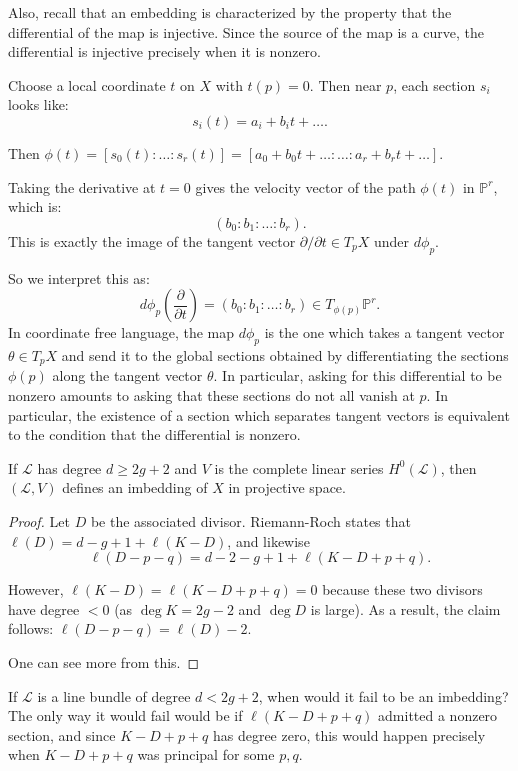 \documentclass[12pt]{article}
\begin{document}
Also, recall that an embedding is characterized by the property that the differential of the map is injective. Since the source of the map is a curve, the differential is injective precisely when it is nonzero. 

Choose a local coordinate $t$ on $X$ with $t(p) = 0$. Then near $p$, each section $s_i$ looks like:
\[
s_i(t) = a_i + b_i t + \ldots.
\]

Then $\phi(t) = [s_0(t) : \ldots : s_r(t)] = [a_0 + b_0 t + \ldots : \ldots : a_r + b_r t + \ldots].$

Taking the derivative at $t = 0$ gives the velocity vector of the path $\phi(t)$ in $\mathbb{P}^r$, which is:
\[
(b_0 : b_1 : \ldots : b_r).
\]
This is exactly the image of the tangent vector $\partial / \partial t \in T_p X$ under $d\phi_p$.

So we interpret this as:
\[
d\phi_p\left(\frac{\partial}{\partial t}\right) = \left(b_0 : b_1 : \ldots : b_r\right) \in T_{\phi(p)} \mathbb{P}^r.
\]
In coordinate free language, the map $d\phi_p$ is the one which takes a tangent vector $\theta \in T_p X$ and send it to the global sections obtained by differentiating the sections $\phi(p)$ along the tangent vector $\theta$. In particular, asking for this differential to be nonzero amounts to asking that these sections do not all vanish at $p$. In particular, the existence of a section which separates tangent vectors is equivalent to the condition that the differential is nonzero.


\begin{corollary}
If $\mathcal{L}$ has degree $d \geq 2g + 2$ and $V$ is the complete linear series $H^0(\mathcal{L})$, then $(\mathcal{L}, V)$ defines an imbedding of $X$ in projective space.
\end{corollary}

\begin{proof}
Let $D$ be the associated divisor. Riemann-Roch states that $\ell(D) = d - g + 1 + \ell(K - D)$, and likewise
$$\ell(D - p - q) = d - 2 - g + 1 + \ell(K - D + p + q).$$

However, $\ell(K - D) = \ell(K - D + p + q) = 0$ because these two divisors have degree $< 0$ (as $\deg K = 2g - 2$ and $\deg D$ is large). As a result, the claim follows: $\ell(D - p - q) = \ell(D) - 2$.

One can see more from this.
\end{proof}


\begin{example}
    If $\mathcal{L}$ is a line bundle of degree $d < 2g + 2$, when would it fail to be an imbedding? The only way it would fail would be if $\ell(K - D + p + q)$ admitted a nonzero section, and since $K - D + p + q$ has degree zero, this would happen precisely when $K - D + p + q$ was principal for some $p, q$.
\end{example}
\end{document}
